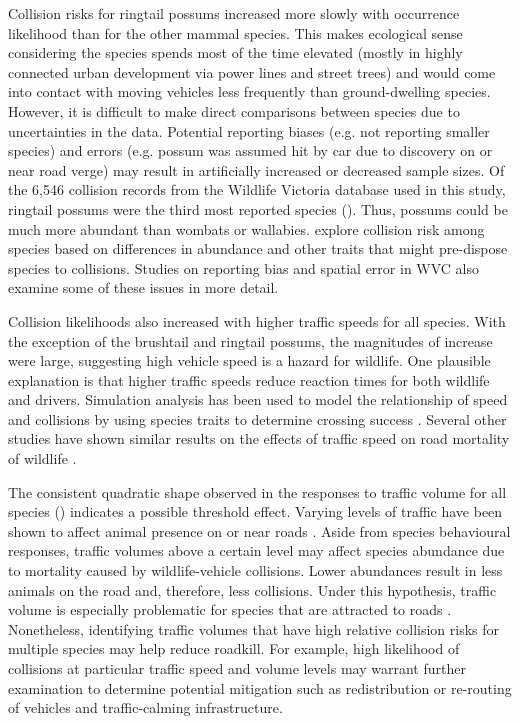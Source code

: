 Collision risks for ringtail possums increased more slowly with occurrence likelihood than for the other mammal species.  This makes ecological sense considering the species spends most of the time elevated (mostly in highly connected urban development via power lines and street trees) and would come into contact with moving vehicles less frequently than ground-dwelling species.  However, it is difficult to make direct comparisons between species due to uncertainties in the data.  Potential reporting biases (e.g. not reporting smaller species) and errors (e.g. possum was assumed hit by car due to discovery on or near road verge) may result in artificially increased or decreased sample sizes. Of the 6,546 collision records from the Wildlife Victoria database used in this study, ringtail possums were the third most reported species ().  Thus, possums could be much more abundant than wombats or wallabies. \cite{gril14} explore collision risk among species based on differences in abundance and other traits that might pre-dispose species to collisions. Studies on reporting bias \citep[e.g.][]{snow15} and spatial error \citep[e.g.][]{guns09} in WVC also examine some of these issues in more detail.

Collision likelihoods also increased with higher traffic speeds for all species.  With the exception of the brushtail and ringtail possums, the magnitudes of increase were large, suggesting high vehicle speed is a hazard for wildlife.  One plausible explanation is that higher traffic speeds reduce reaction times for both wildlife and drivers. Simulation analysis has been used to model the relationship of speed and collisions by using species traits to determine crossing success \citep{jaar06}. Several other studies have shown similar results on the effects of traffic speed on road mortality of wildlife \citep[e.g.][]{farm12,gkri13,lao11,ramp06a,seil05,seil06,sudh09,vanl09}.

The consistent quadratic shape observed in the responses to traffic volume for all species () indicates a possible threshold effect.  Varying levels of traffic have been shown to affect animal presence on or near roads \citep{jaeg05,rhod14}. Aside from species behavioural responses, traffic volumes above a certain level may affect species abundance due to mortality caused by wildlife-vehicle collisions. Lower abundances result in less animals on the road and, therefore, less collisions. Under this hypothesis, traffic volume is especially problematic for species that are attracted to roads \citep{form03}. Nonetheless, identifying traffic volumes that have high relative collision risks for multiple species may help reduce roadkill.  For example, high likelihood of collisions at particular traffic speed and volume levels may warrant further examination to determine potential mitigation such as redistribution or re-routing of vehicles and traffic-calming infrastructure.

